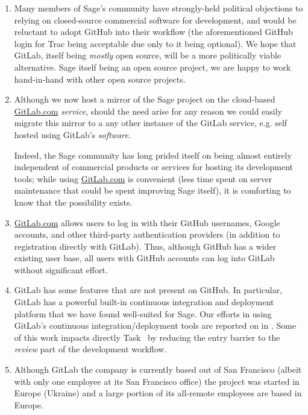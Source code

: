 \begin{enumerate}
\item Many members of Sage's community have strongly-held political objections
    to relying on closed-source commercial software for development, and would
    be reluctant to adopt GitHub into their workflow (the aforementioned GitHub
    login for Trac being acceptable due only to it being optional).  We hope
    that GitLab, itself being {\em mostly} open source, will be a more
    politically viable alternative. Sage itself being an open source project,
    we are happy to work hand-in-hand with other open source projects.

  \item Although we now host a mirror of the Sage project on
    the cloud-based \url{GitLab.com} {\em service}, should the need
    arise for any reason we could easily migrate this mirror to a
    any other instance of the GitLab service, e.g. self hosted using
    GitLab's {\em software}.

    Indeed, the Sage community has long prided itself
    on being almost entirely independent of commercial products or services for
    hosting its development tools; while using \url{GitLab.com} is
    convenient (less time spent on server maintenance that could be
    spent improving Sage itself), it is comforting to know that the
    possibility exists.
\item \url{GitLab.com} allows users to log in with their GitHub usernames, Google
    accounts, and other third-party authentication providers (in addition to
    registration directly with GitLab).  Thus, although GitHub has a wider
    existing user base, all users with GitHub accounts can log into GitLab
    without significant effort.

\item GitLab has some features that are not present on GitHub.  In particular,
    GitLab has a powerful built-in continuous integration and deployment
    platform that we have found well-suited for Sage.  Our efforts in using
    GitLab's continuous integration/deployment tools are reported on
    in .
    Some of this work impacts directly
    Task~
    by reducing the entry barrier to the {\em review} part of the
    development workflow.
\item Although GitLab the company is currently based out of San Francisco
    (albeit with only one employee at its San Francisco office) the project
    was started in Europe (Ukraine) and a large portion of its all-remote
    employees are based in Europe.
\end{enumerate}


